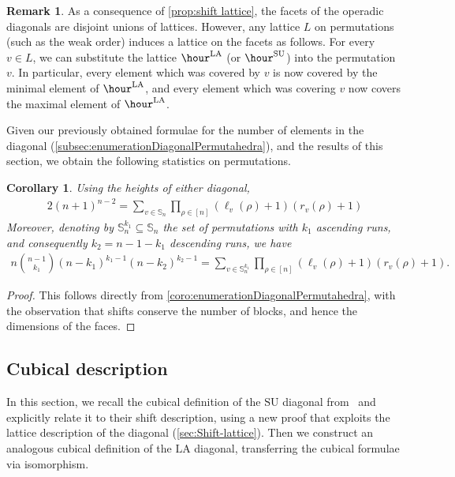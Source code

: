 \documentclass{amsart}
\newtheorem{corollary}[theorem]{Corollary}
\theoremstyle{definition}
\newtheorem{remark}[theorem]{Remark}
\newcommand{\SU}{\mathrm{SU}}
\newcommand{\LA}{\mathrm{LA}}
\begin{document}
\begin{remark}
As a consequence of \cref{prop:shift lattice}, the facets of the operadic diagonals are disjoint unions of lattices.
However, any lattice $L$ on permutations (such as the weak order) induces a lattice on the facets as follows.
For every $v \in L$, we can substitute the lattice $\hour^\LA$ (or $\hour^\SU$) into the permutation $v$.
In particular, every element which was covered by $v$ is now covered by the minimal element of $\hour^\LA$, and every element which was covering $v$ now covers the maximal element of $\hour^\LA$.
\end{remark}

Given our previously obtained formulae for the number of elements in the diagonal (\cref{subsec:enumerationDiagonalPermutahedra}), and the results of this section, we obtain the following statistics on permutations.

\begin{corollary}
	\label{cor:statistics-lattice}
Using the heights of either diagonal,
\begin{align*}
2(n+1)^{n-2} = \sum_{v \in \mathbb{S}_n} \prod_{\rho \in [n]} (\ell_v(\rho)+1)(r_v(\rho)+1)
\end{align*}
Moreover, denoting by $\mathbb{S}_n^{k_1} \subseteq \mathbb{S}_n$ the set of permutations with $k_1$ ascending runs, and consequently $k_2 = n-1-k_1$ descending runs, we have 
\begin{align*}
n \binom{n-1}{k_1} (n-k_1)^{k_1-1} (n-k_2)^{k_2-1} = \sum_{v \in \mathbb{S}_n^{k_1}} \prod_{\rho \in [n]} (\ell_v(\rho)+1)(r_v(\rho)+1).
\end{align*}
\end{corollary}

\begin{proof}
This follows directly from \cref{coro:enumerationDiagonalPermutahedra}, with the observation that shifts conserve the number of blocks, and hence the dimensions of the faces.
\end{proof}


\subsection{Cubical description}
\label{sec:Cubical}

In this section, we recall the cubical definition of the $\SU$ diagonal from~\cite{SaneblidzeUmble-comparingDiagonals} and explicitly relate it to their shift description, using a new proof that exploits the lattice description of the diagonal (\cref{sec:Shift-lattice}).
Then we construct an analogous cubical definition of the $\LA$ diagonal, transferring the cubical formulae via isomorphism.
\end{document}
